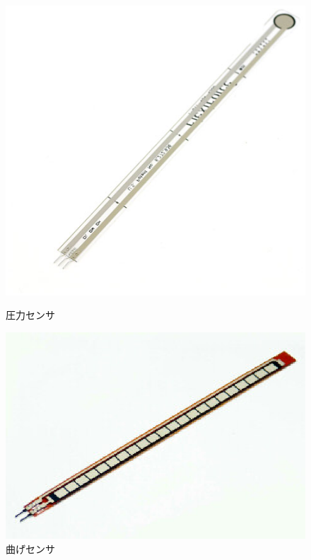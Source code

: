 \documentclass[11pt,a4paper]{jarticle}
\begin{document}
\begin{figure}[h!]
 \begin{minipage}{0.5\columnwidth}
  \centering
  \includegraphics[width=\columnwidth]{img/pressure_sensor.eps}
  \caption{圧力センサ}
 \end{minipage}
 \begin{minipage}{0.5\columnwidth}
  \centering
  \includegraphics[width=\columnwidth]{img/flex_sensor.eps}
  \caption{曲げセンサ}
 \end{minipage}
\end{figure}
\end{document}
